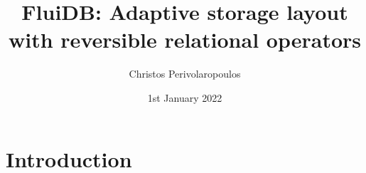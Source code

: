 \documentclass[fontsize=12pt,paper=letter,twosided,cleardoublepage=plain,final]{scrbook}
\title{FluiDB: Adaptive storage layout with reversible relational operators}
\author{Christos Perivolaropoulos}
\date{1st January 2022}
\begin{document}
\frontmatter


\mainmatter

\chapter{Introduction}
\label{chapter:introduction}


% 

% 

% 


% 

% 

% 

% 

\begin{spacing}{1}
\printbibliography
\end{spacing}

\backmatter
\end{document}
